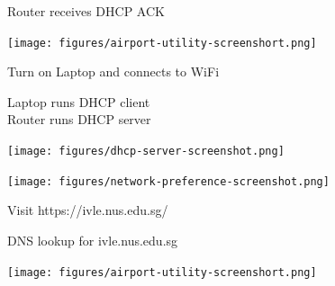 \begin{cf}{
	Router receives DHCP ACK
}
\end{cf}



\begin{cf}{
	\texttt{[image: figures/airport-utility-screenshort.png]}
}
\end{cf}

\begin{cf}{
	Turn on Laptop and
	connects to WiFi
}
\end{cf}

\begin{cf}{
	Laptop runs DHCP client\\
	Router runs DHCP server
}
\end{cf}



\begin{cf}{
	\texttt{[image: figures/dhcp-server-screenshot.png]}
}
\end{cf}

\begin{cf}{
	\texttt{[image: figures/network-preference-screenshot.png]}
}
\end{cf}

\begin{cf}{
	Visit https://ivle.nus.edu.sg/
}
\end{cf}

\begin{cf}{
	DNS lookup for ivle.nus.edu.sg
}
\end{cf}

\begin{cf}{
	\texttt{[image: figures/airport-utility-screenshort.png]}
}
\end{cf}

\begin{cf}{
}
\end{cf}


